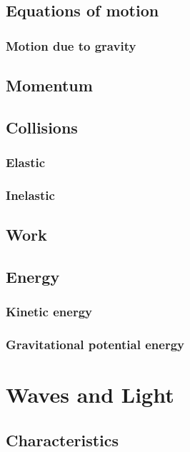 \documentclass{book}
\begin{document}
\section{Equations of motion}
\subsection{Motion due to gravity}


\section{Momentum}


\section{Collisions}
\subsection{Elastic}

\subsection{Inelastic}


\section{Work}


\section{Energy}
\subsection{Kinetic energy}

\subsection{Gravitational potential energy}



\chapter{Waves and Light}
\section{Characteristics}
\end{document}
